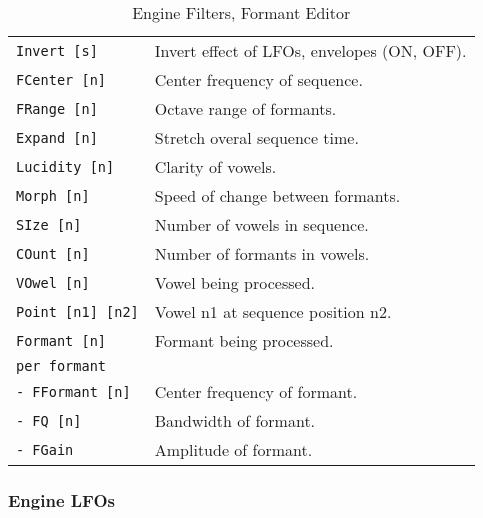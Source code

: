    \begin{table}[H]
      \centering
      \caption{Engine Filters, Formant Editor}
      \label{table:yoshimi_engine_filters_formant_editor}
      \begin{tabular}{l l}

\texttt{Invert [s]} &
   Invert effect of LFOs, envelopes (ON, OFF). \\
\texttt{FCenter [n]} &
   Center frequency of sequence. \\
\texttt{FRange [n]} &
   Octave range of formants. \\
\texttt{Expand [n]} &
   Stretch overal sequence time. \\
\texttt{Lucidity [n]} &
   Clarity of vowels. \\
\texttt{Morph [n]} &
   Speed of change between formants. \\
\texttt{SIze [n]} &
   Number of vowels in sequence. \\
\texttt{COunt [n]} &
   Number of formants in vowels. \\
\texttt{VOwel [n]} &
   Vowel being processed. \\
\texttt{Point [n1] [n2]} &
   Vowel n1 at sequence position n2. \\
\texttt{Formant [n]} &
   Formant being processed. \\
\texttt{per formant} &
    \\
\texttt{-  FFormant [n]} &
   Center frequency of formant. \\
\texttt{-  FQ [n]} &
   Bandwidth of formant. \\
\texttt{-  FGain} &
   Amplitude of formant. \\
      \end{tabular}
   \end{table}

\subsubsection{Engine LFOs}
\label{subsec:command_line_engine_lfos}

